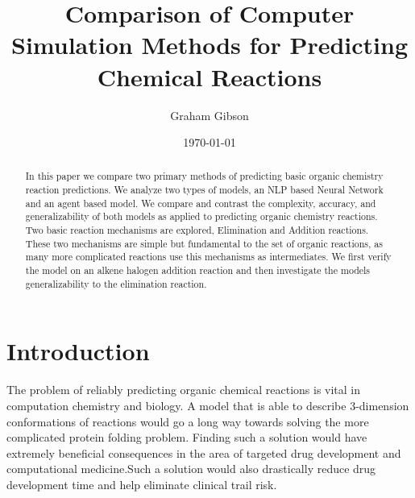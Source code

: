 \documentclass[aps,floatfix,prd,showpacs]{revtex4}
\begin{document}
\title{Comparison of Computer Simulation Methods for Predicting Chemical Reactions}
\author{Graham Gibson}

\date{\today}

\begin{abstract}

In this paper we compare two primary methods of predicting basic organic chemistry reaction predictions. We analyze two types of models, an NLP based Neural Network and an agent based model. We compare and contrast the complexity, accuracy, and generalizability of both models as applied to predicting organic chemistry reactions. Two basic reaction mechanisms are explored, Elimination and Addition reactions.  These two mechanisms are simple but fundamental to the set of organic reactions, as many more complicated reactions use this mechanisms as intermediates.  We first verify the model on an alkene halogen addition reaction and then investigate the models generalizability to the elimination reaction. 


\end{abstract}
	\maketitle

\section{Introduction}

The problem of reliably predicting organic chemical reactions is vital in computation chemistry and biology. A model that is able to describe 3-dimension conformations of reactions would go a long way towards solving the more complicated protein folding problem.\cite{AbProtein} Finding such a solution would have extremely beneficial consequences in the area of targeted drug development and computational medicine.Such a solution would also drastically reduce drug development time and help eliminate clinical trail risk. \cite{dugDiscover} 
\end{document}
